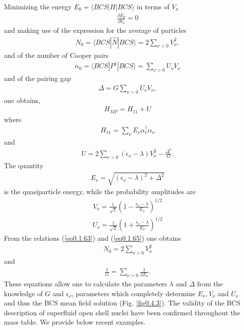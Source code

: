 \documentclass[a4paper,11pt]{book}
\numberwithin{equation}{section}
\numberwithin{figure}{section}
\numberwithin{table}{section}
\newcommand{\braket}[1]{\langle {#1} \rangle }
\begin{document}
Minimizing the energy $E_0=\braket{BCS|H|BCS}$ in terms of $V_\nu$
\begin{align}\label{eq0.1.62}
\frac{\partial E_0}{\partial V_\nu}=0
\end{align}
and making use of the expression for the average of particles
\begin{align}\label{eq0.1.63}
N_0=\braket{BCS|\hat N|BCS}=2\sum_{\nu>0}V_\nu^2,
\end{align}
and of the number of Cooper pairs
\begin{align}\label{eq0.1.64}
\alpha_0=\braket{BCS|P^\dagger|BCS}=\sum_{\nu>0}U_\nu V_\nu
\end{align}
and of the pairing gap
\begin{align}\label{eq0.1.65}
\Delta=G\sum_{\nu>0}U_\nu V_{\nu},
\end{align}
one obtains,
\begin{align}\label{eq0.1.66}
H_{MF}=H_{11}+U
\end{align}
where 
\begin{align}\label{eq0.1.67}
H_{11}=\sum_\nu E_\nu \alpha^\dagger_\nu\alpha_\nu
\end{align}
and
\begin{align}\label{eq0.1.68}
U=2\sum_{\nu>0}(\epsilon_\nu-\lambda)V^2_\nu-\frac{\Delta^2}{G}.
\end{align}
The quantity
\begin{align}\label{eq0.1.69}
E_\nu=\sqrt{(\epsilon_\nu-\lambda)^2+\Delta^2}
\end{align}
is the quasiparticle energy, while the probability amplitudes are
\begin{align}\label{eq0.1.70}
V_\nu=\frac{1}{\sqrt{2}}\left(1-\frac{\epsilon_\nu-\lambda}{E_\nu}\right)^{1/2}
\end{align}
\begin{align}\label{eq0.1.71}
U_\nu=\frac{1}{\sqrt{2}}\left(1+\frac{\epsilon_\nu-\lambda}{E_\nu}\right)^{1/2}
\end{align}
 From the relations (\ref{eq0.1.63}) and (\ref{eq0.1.65}) one obtains
\begin{align}\label{eq0.1.72}
N_0=2\sum_{\nu>0}V^2_\nu
\end{align}
 and 
\begin{align}\label{eq0.1.73}
\frac{1}{G}=\sum_{\nu>0}\frac{1}{2E_\nu}.
\end{align}
These equations allow one to calculate the parameters $\lambda$ and $\Delta$ from the knowledge of $G$ and $\epsilon_\nu$, parameters which completely determine $E_\nu,V_\nu$ and $U_\nu$ and thus the BCS mean field solution (Fig. \ref{fig0.4.3}).
The validity of the BCS description of superfluid open shell nuclei have been confirmed throughout the mass table. We provide below recent examples.
\end{document}
